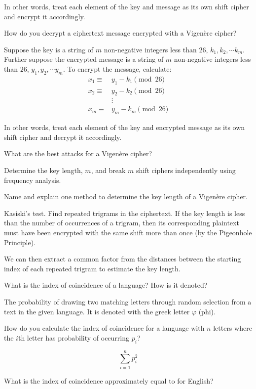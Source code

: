 \documentclass{article}
\newcounter{qcounter}
\newcommand{\showqcounter}{\theqcounter}
\newcommand{\question}{\vspace{5mm}\addtocounter{qcounter}{1}\vspace{5mm}{\bf Q\showqcounter: }}
\newcommand{\answer}{\vspace{5mm}{\bf A\showqcounter: }}
\begin{document}
  In other words, treat each element of the key and message as its own shift cipher and encrypt it accordingly.


\question How do you decrypt a ciphertext message encrypted with a Vigen\`ere cipher?

\answer Suppose the key is a string of $m$ non-negative integers less than $26$, $k_1, k_2, \cdots k_m$.
  Further suppose the encrypted message is a string of $m$ non-negative integers less than $26$, $y_1, y_2, \cdots y_m$.
  To encrypt the message, calculate:
  \begin{align*}
    x_1 \equiv& y_1 - k_1 \pmod{26}\\
    x_2 \equiv& y_2 - k_2 \pmod{26}\\
              &\vdots\\
    x_m \equiv& y_m - k_m \pmod{26}
  \end{align*}

  In other words, treat each element of the key and encrypted message as its own shift cipher and decrypt it accordingly.

\question What are the best attacks for a Vigen\`ere cipher?

\answer Determine the key length, $m$, and break $m$ shift ciphers independently using frequency analysis.

\question Name and explain one method to determine the key length of a Vigen\`ere cipher.

\answer Kasiski's test. Find repeated trigrams in the ciphertext. If the key length is less than the number of occurrences of 
  a trigram, then its corresponding plaintext must have been encrypted with the same shift more than once (by the Pigeonhole Principle).

  We can then extract a common factor from the distances between the starting index of each repeated trigram to estimate the key length.


\question What is the index of coincidence of a language? How is it denoted?

\answer The probability of drawing two matching letters through random selection from a text in the given language.
  It is denoted with the greek letter $\varphi$ (phi).


\question How do you calculate the index of coincidence for a language with $n$ letters where the $i$th letter has 
  probability of occurring $p_i$?

\answer 
  $$
    \sum_{i=1}^n p_i^2
  $$


\question What is the index of coincidence approximately equal to for English?
\end{document}
